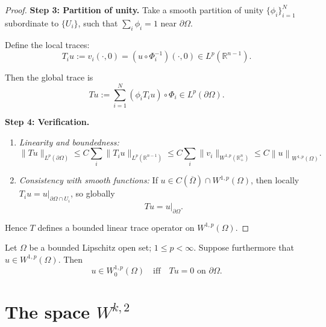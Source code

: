 \begin{theorem}
\begin{proof}
        \medskip

        \textbf{Step 3: Partition of unity.}
        Take a smooth partition of unity $\{\phi_i\}_{i=1}^N$ subordinate to $\{U_i\}$, such that $\sum_i \phi_i = 1$ near $\partial \Omega$.

        Define the local traces:
        \[
            T_i u := v_i(\cdot,0) = (u \circ \Phi_i^{-1})(\cdot,0) \in L^p(\mathbb{R}^{n-1}).
        \]

        Then the global trace is
        \[
            Tu := \sum_{i=1}^N (\phi_i T_i u) \circ \Phi_i \in L^p(\partial \Omega).
        \]

        \medskip

        \textbf{Step 4: Verification.}
        \begin{enumerate}[label=(\alph*)]
            \item \emph{Linearity and boundedness:}
                  \[
                      \|Tu\|_{L^p(\partial \Omega)} \le C \sum_i \|T_i u\|_{L^p(\mathbb{R}^{n-1})} \le C \sum_i \|v_i\|_{W^{1,p}(\mathbb{R}^n_+)} \le C \left\|u\right\|_{W^{1,p}(\Omega)}.
                  \]
            \item \emph{Consistency with smooth functions:}
                  If $u \in C(\overline{\Omega}) \cap W^{1,p}(\Omega)$, then locally $T_i u = u|_{\partial \Omega \cap U_i}$, so globally
                  \[
                      Tu = u|_{\partial \Omega}.
                  \]
        \end{enumerate}

        Hence $T$ defines a bounded linear trace operator on $W^{1,p}(\Omega)$.
    \end{proof}
\end{theorem}



\begin{theorem}
    \label{thm:trace-zero}
    Let $\Omega $ be a bounded Lipschitz open set; \(1\leq p <\infty\). Suppose furthermore that \( u \in W^{1,p}\left(\Omega\right) \). Then
    \[
        u \in W_0^{1,p}\left(\Omega\right) \quad \text{iff} \quad Tu = 0 \text{ on } \partial \Omega.
    \]
\end{theorem}



\section{The space $W^{k,2}$}

